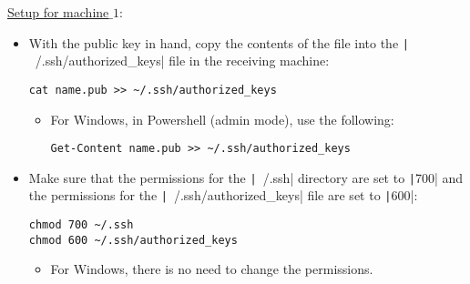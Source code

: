 \underline{\underline{Setup for machine$\_1$}}:

\begin{itemize}
    \item With the public key in hand, copy the contents of the file into the
    \texttt|~/.ssh/authorized_keys| file in the receiving machine:
    \begin{verbatim}
cat name.pub >> ~/.ssh/authorized_keys
    \end{verbatim}
    \begin{itemize}
        \item For Windows, in Powershell (admin mode), use the following:
        \begin{verbatim}
Get-Content name.pub >> ~/.ssh/authorized_keys
        \end{verbatim}
    \end{itemize}
    \item Make sure that the permissions for the \texttt|~/.ssh|
    directory are set to \texttt|700| and the permissions for the
    \texttt|~/.ssh/authorized_keys| file are set to
    \texttt|600|:
    \begin{verbatim}
chmod 700 ~/.ssh
chmod 600 ~/.ssh/authorized_keys
    \end{verbatim}
    \begin{itemize}
        \item For Windows, there is no need to change the permissions.
    \end{itemize}
\end{itemize}
